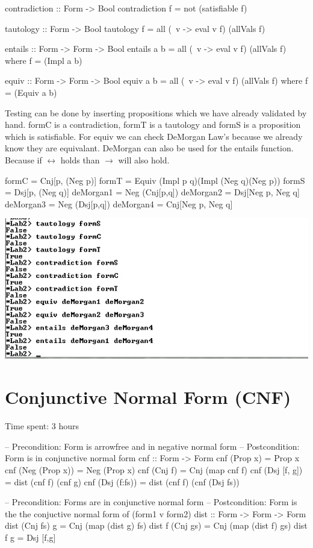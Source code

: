 \documentclass{article}
\begin{document}
\begin{code}
contradiction :: Form -> Bool
contradiction f = not (satisfiable f)

tautology :: Form -> Bool
tautology f = all (\ v -> eval v f) (allVals f)

entails :: Form -> Form -> Bool
entails a b = all (\ v -> eval v f) (allVals f) where f = (Impl a b)

equiv :: Form -> Form -> Bool
equiv a b = all (\ v -> eval v f) (allVals f) where f = (Equiv a b)

\end{code}

Testing can be done by inserting propositions which we have already validated by hand.
formC is a contradiction, formT is a tautology and formS is a proposition which is satisfiable.
For equiv we can check DeMorgan Law's because we already know they are equivalant. DeMorgan can also be used for the entails function. Because if $ \leftrightarrow $ holds than $ \rightarrow $ will also hold.

\begin{code}
formC =  Cnj[p, (Neg p)]
formT = Equiv (Impl p q)(Impl (Neg q)(Neg p))
formS = Dsj[p, (Neg q)]
deMorgan1 = Neg (Cnj[p,q])
deMorgan2 = Dsj[Neg p, Neg q]
deMorgan3 = Neg (Dsj[p,q])
deMorgan4 = Cnj[Neg p, Neg q]
\end{code}

\includegraphics{Knipsel3}

\section*{Conjunctive Normal Form (CNF)}
Time spent: 3 hours

\begin{code}
-- Precondition: Form is arrowfree and in negative normal form
-- Postcondition: Form is in conjunctive normal form
cnf :: Form -> Form
cnf (Prop x)		= Prop x
cnf (Neg (Prop x))	= Neg (Prop x)
cnf (Cnj f)		= Cnj (map cnf f)
cnf (Dsj [f, g])	= dist (cnf f) (cnf g)
cnf (Dsj (f:fs))	= dist (cnf f) (cnf (Dsj fs))

-- Precondition: Forms are in conjunctive normal form
-- Postcondition: Form is the the conjuctive normal form of (form1 v form2)
dist :: Form -> Form -> Form
dist (Cnj fs) g 	= Cnj (map (dist g) fs)
dist f (Cnj gs)		= Cnj (map (dist f) gs)
dist f g 		= Dsj [f,g]

\end{code}
\end{document}

